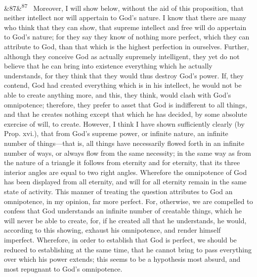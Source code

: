 \documentclass[12pt]{article}
\newcommand{\para}[1][]{\par\noindent\ifx&#1&\else\textsuperscript{\footnotesize #1}~\fi}
\begin{document}
\para[87] Moreover, I will show below, without the aid of this proposition, that neither intellect nor will appertain to God's nature. I know that there are many who think that they can show, that supreme intellect and free will do appertain to God's nature; for they say they know of nothing more perfect, which they can attribute to God, than that which is the highest perfection in ourselves. Further, although they conceive God as actually supremely intelligent, they yet do not believe that he can bring into existence everything which he actually understands, for they think that they would thus destroy God's power. If, they contend, God had created everything which is in his intellect, he would not be able to create anything more, and this, they think, would clash with God's omnipotence; therefore, they prefer to asset that God is indifferent to all things, and that he creates nothing except that which he has decided, by some absolute exercise of will, to create. However, I think I have shown sufficiently clearly (by Prop. xvi.), that from God's supreme power, or infinite nature, an infinite number of things---that is, all things have necessarily flowed forth in an infinite number of ways, or always flow from the same necessity; in the same way as from the nature of a triangle it follows from eternity and for eternity, that its three interior angles are equal to two right angles. Wherefore the omnipotence of God has been displayed from all eternity, and will for all eternity remain in the same state of activity. This manner of treating the question attributes to God an omnipotence, in my opinion, far more perfect. For, otherwise, we are compelled to confess that God understands an infinite number of creatable things, which he will never be able to create, for, if he created all that he understands, he would, according to this showing, exhaust his omnipotence, and render himself imperfect. Wherefore, in order to establish that God is perfect, we should be reduced to establishing at the same time, that he cannot bring to pass everything over which his power extends; this seems to be a hypothesis most absurd, and most repugnant to God's omnipotence.
\end{document}
